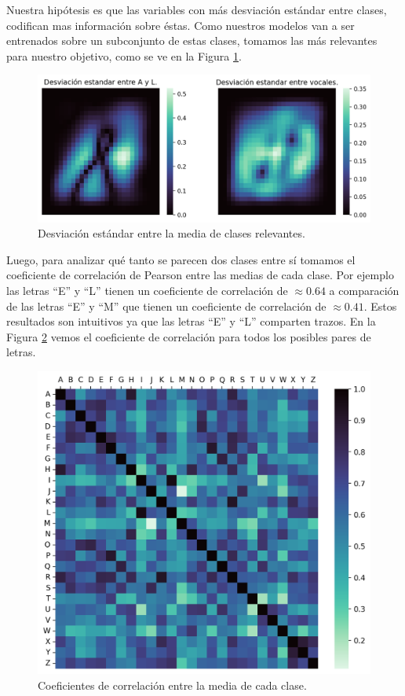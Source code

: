 \documentclass[11pt,a4paper, twocolumn]{article}
\begin{document}
Nuestra hipótesis es que las variables con más desviación estándar entre clases, codifican mas información sobre éstas. Como nuestros modelos van a ser entrenados sobre un subconjunto de estas clases, tomamos las más relevantes para nuestro objetivo, como se ve en la Figura \ref{fig:3a}.

\begin{figure}[H]
	\centering
	\includegraphics[scale=0.7]{figuras/3a.png}
	\caption{Desviación estándar entre la media de clases relevantes.}
	\label{fig:3a}
\end{figure}

Luego, para analizar qué tanto se parecen dos clases entre sí tomamos el coeficiente de correlación de Pearson entre las medias de cada clase. Por ejemplo las letras ``E'' y ``L'' tienen un coeficiente de correlación de $\approx 0.64$ a comparación de las letras ``E'' y ``M'' que tienen un coeficiente de correlación de $\approx 0.41$. Estos resultados son intuitivos ya que las letras ``E'' y ``L'' comparten trazos. En la Figura \ref{fig:4a} vemos el coeficiente de correlación para todos los posibles pares de letras.

\begin{figure}[H]
	\centering
	\includegraphics[scale=0.6]{figuras/4a.png}
	\caption{Coeficientes de correlación entre la media de cada clase.}
	\label{fig:4a}
\end{figure}
\end{document}
